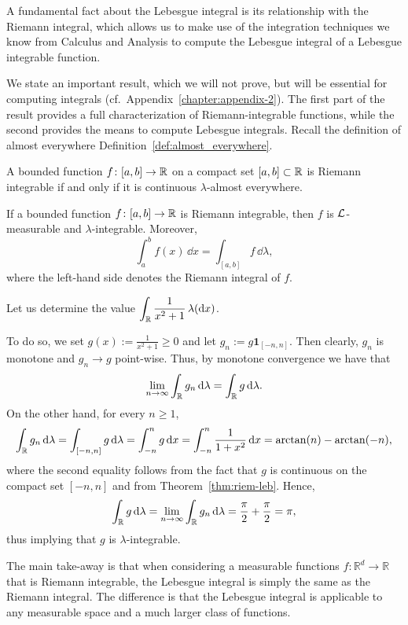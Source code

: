 A fundamental fact about the Lebesgue integral is its relationship with the Riemann integral, which allows us to make use of the integration techniques we know from Calculus and Analysis to compute the Lebesgue integral of a Lebesgue integrable function.

We state an important result, which we will not prove, but will be essential for computing integrals (cf.\ Appendix~\ref{chapter:appendix-2}). The first part of the result provides a full characterization of Riemann-integrable functions, while the second provides the means to compute Lebesgue integrals. Recall the definition of almost everywhere Definition~\ref{def:almost_everywhere}.

\begin{theorem}\label{thm:riem-leb}
	A bounded function $f\colon [a,b] \to \mathbb R$ on a compact set $[a,b]\subset\mathbb R$ is Riemann integrable if and only if it is continuous $\lambda$-almost everywhere.
	
	If a bounded function $f\colon [a,b] \to \mathbb R$ is Riemann integrable, then $f$ is $\mathcal L$-measurable and $\lambda$-integrable. Moreover,
	\[
		\int_a^b f(x) \,\dd x = \int_{[a,b]} f \,\dd \lambda,
	\]
	where the left-hand side denotes the Riemann integral of $f$.
\end{theorem}

\begin{example}\label{ex:computation_lebesgue_integral}
	Let us determine the value $\displaystyle \int_{\mathbb R} \frac{1}{x^2+1}\,\lambda(\mathrm{d} x)$.
	
	\noindent To do so, we set $g(x):= \frac{1}{x^2+1}\ge 0$ and let $g_n:= g\mathbf{1}_{[-n,n]}$. Then clearly, $g_n$ is monotone and $g_n\to g$ point-wise. Thus, by monotone convergence we have that
\[
	\lim_{n\to\infty} \int_{\mathbb R} g_n\,\mathrm{d}\lambda = \int_{\mathbb R} g\,\mathrm{d}\lambda.
\]
On the other hand, for every $n\ge 1$,
\[
	\int_{\mathbb R} g_n\,\mathrm{d}\lambda = \int_{[-n,n]} g\,\mathrm{d}\lambda = \int_{-n}^n g\,\mathrm{d} x = \int_{-n}^n \frac{1}{1+x^2}\,\mathrm{d} x = \arctan(n) - \arctan(-n),
\]
where the second equality follows from the fact that $g$ is continuous on the compact set $[-n,n]$ and from Theorem~\ref{thm:riem-leb}. Hence,
\[
	\int_{\mathbb R} g\,\mathrm{d}\lambda=\lim_{n\to\infty} \int_{\mathbb R} g_n\,\mathrm{d}\lambda = \frac{\pi}{2} + \frac{\pi}{2} = \pi,
\]
thus implying that $g$ is $\lambda$-integrable.
\end{example}

\begin{remark}
The main take-away is that when considering a measurable functions $f : \mathbb{R}^d \to \mathbb{R}$ that is Riemann integrable, the Lebesgue integral is simply the same as the Riemann integral. The difference is that the Lebesgue integral is applicable to any measurable space and a much larger class of functions.
\end{remark}

